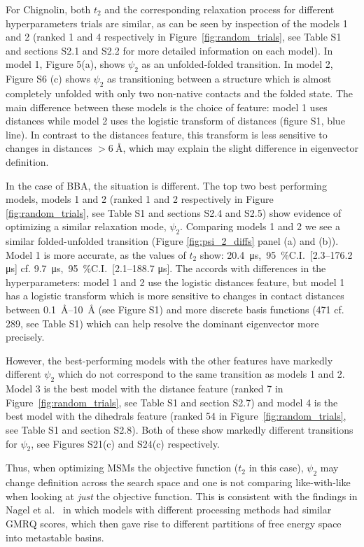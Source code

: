 \documentclass[journal=jacsat,manuscript=article]{achemso}
\newcommand{\SIci}[4]{\SI{#1}{#4},\ \SI{95}{\percent}C.I.\ [\numrange[range-phrase=---]{#2}{#3} \si{#4}]}
\begin{document}
For Chignolin, both $t_2$ and the corresponding relaxation process for different hyperparameters trials are similar, as can be seen by inspection of the models 1 and 2 (ranked 1 and 4 respectively in Figure~\ref{fig:random_trials}, see Table S1 and sections S2.1 and S2.2 for more detailed information on each model).  In model 1, Figure 5(a), shows $\psi_2$ as an unfolded-folded transition.  In model 2, Figure S6 (c) shows $\psi_2$ as transitioning between a structure which is almost completely unfolded with only two non-native contacts and the folded state. The main difference between these models is the choice of feature: model 1 uses distances while model 2 uses the logistic transform of distances (figure S1, blue line). In contrast to the distances feature, this transform is less sensitive to changes in distances $>\SI{6}{\angstrom}$, which may explain the slight difference in eigenvector definition. 

In the case of BBA, the situation is different. The top two best performing models, models 1 and 2 (ranked 1 and 2 respectively in Figure \ref{fig:random_trials}, see Table S1 and sections S2.4 and S2.5) show evidence of optimizing a similar relaxation mode, $\psi_2$.  Comparing models 1 and 2 we see a similar folded-unfolded transition (Figure \ref{fig:psi_2_diffs} panel (a) and (b)). Model 1 is more accurate, as the values of $t_2$ show: \SIci{20.4}{2.3}{176.2}{\micro\second} cf. \SIci{9.7}{2.1}{188.7}{\micro\second}. The accords with differences in the hyperparameters: model 1 and 2 use the logistic distances feature, but model 1 has a logistic transform which is more sensitive to changes in contact distances between \SIrange[range-phrase=---]{0.1}{10}{\angstrom} (see Figure S1) and more discrete basis functions (471 cf. 289, see Table S1) which can help resolve the dominant eigenvector more precisely. 

However, the best-performing models with the other features have markedly different $\psi_2$ which do not correspond to the same transition as models 1 and 2.  Model 3 is the best model with the distance feature (ranked 7 in Figure~\ref{fig:random_trials}, see Table S1 and section S2.7) and model 4 is the best model with the dihedrals feature (ranked 54 in Figure~\ref{fig:random_trials}, see Table S1 and section S2.8). Both of these show markedly different transitions for $\psi_2$, see Figures S21(c) and S24(c) respectively. 

Thus, when optimizing MSMs the objective function ($t_2$ in this case), $\psi_2$ may change definition across the search space and one is not comparing like-with-like when looking at \emph{just} the objective function.  This is consistent with the findings in Nagel et al.~\cite{nagelBenchmarkMarkovState2023} in which models  with different processing methods had similar GMRQ scores, which then gave rise to different partitions of free energy space into metastable basins. 
\end{document}

